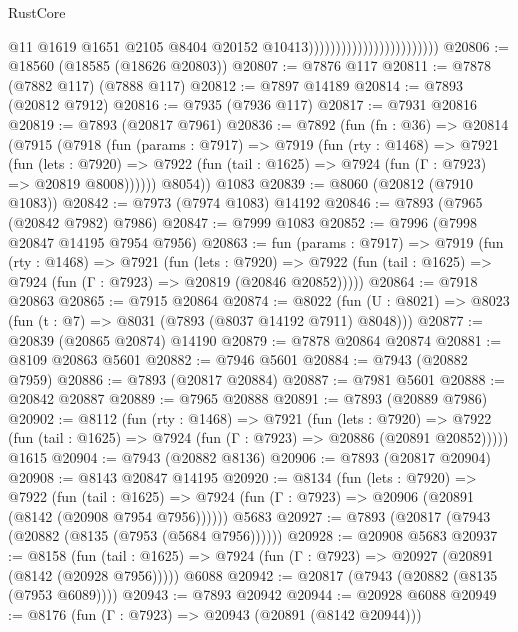\begin{lexlean}{RustCore}
\begin{coremodule}
                                                    @11
                                                    @1619
                                                    @1651
                                                    @2105
                                                    @8404
                                                    @20152
                                                    @10413))))))))))))))))))))))))
@20806 := @18560 (@18585 (@18626 @20803))
@20807 := @7876 @117
@20811 := @7878 (@7882 @117) (@7888 @117)
@20812 := @7897 @14189
@20814 := @7893 (@20812 @7912)
@20816 := @7935 (@7936 @117)
@20817 := @7931 @20816
@20819 := @7893 (@20817 @7961)
@20836 := @7892
    (fun (fn : @36) =>
    @20814
      (@7915
        (@7918
          (fun (params : @7917) =>
          @7919
            (fun (rty : @1468) =>
            @7921
              (fun (lets : @7920) =>
              @7922 (fun (tail : @1625) => @7924 (fun (Γ : @7923) => @20819 @8008))))))
        @8054))
    @1083
@20839 := @8060 (@20812 (@7910 @1083))
@20842 := @7973 (@7974 @1083) @14192
@20846 := @7893 (@7965 (@20842 @7982) @7986)
@20847 := @7999 @1083
@20852 := @7996 (@7998 @20847 @14195 @7954 @7956)
@20863 := fun (params : @7917) =>
  @7919
    (fun (rty : @1468) =>
    @7921
      (fun (lets : @7920) =>
      @7922 (fun (tail : @1625) => @7924 (fun (Γ : @7923) => @20819 (@20846 @20852)))))
@20864 := @7918 @20863
@20865 := @7915 @20864
@20874 := @8022
    (fun (U : @8021) => @8023 (fun (t : @7) => @8031 (@7893 (@8037 @14192 @7911) @8048)))
@20877 := @20839 (@20865 @20874) @14190
@20879 := @7878 @20864 @20874
@20881 := @8109 @20863 @5601
@20882 := @7946 @5601
@20884 := @7943 (@20882 @7959)
@20886 := @7893 (@20817 @20884)
@20887 := @7981 @5601
@20888 := @20842 @20887
@20889 := @7965 @20888
@20891 := @7893 (@20889 @7986)
@20902 := @8112
    (fun (rty : @1468) =>
    @7921
      (fun (lets : @7920) =>
      @7922 (fun (tail : @1625) => @7924 (fun (Γ : @7923) => @20886 (@20891 @20852)))))
    @1615
@20904 := @7943 (@20882 @8136)
@20906 := @7893 (@20817 @20904)
@20908 := @8143 @20847 @14195
@20920 := @8134
    (fun (lets : @7920) =>
    @7922
      (fun (tail : @1625) =>
      @7924 (fun (Γ : @7923) => @20906 (@20891 (@8142 (@20908 @7954 @7956))))))
    @5683
@20927 := @7893 (@20817 (@7943 (@20882 (@8135 (@7953 (@5684 @7956))))))
@20928 := @20908 @5683
@20937 := @8158
    (fun (tail : @1625) => @7924 (fun (Γ : @7923) => @20927 (@20891 (@8142 (@20928 @7956)))))
    @6088
@20942 := @20817 (@7943 (@20882 (@8135 (@7953 @6089))))
@20943 := @7893 @20942
@20944 := @20928 @6088
@20949 := @8176 (fun (Γ : @7923) => @20943 (@20891 (@8142 @20944)))

\end{coremodule}
\end{lexlean}
